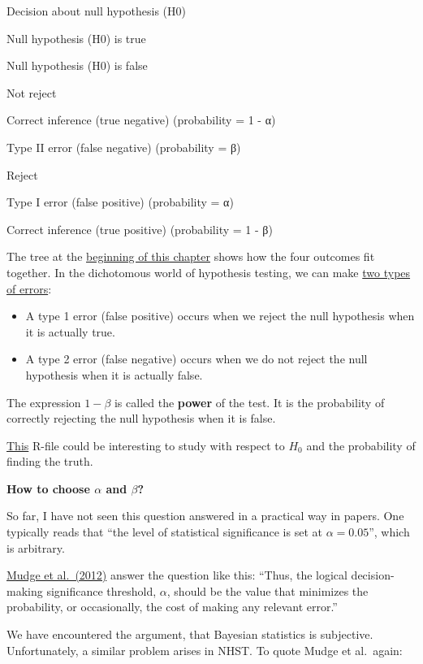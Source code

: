 \documentclass[
]{book}
\providecommand{\tightlist}{%
  \setlength{\itemsep}{0pt}\setlength{\parskip}{0pt}}
\begin{document}
Decision about null hypothesis (H0)

Null hypothesis (H0) is true

Null hypothesis (H0) is false

Not reject

Correct inference (true negative)
(probability = 1 - α)

Type II error (false negative)
(probability = β)

Reject

Type I error (false positive)
(probability = α)

Correct inference (true positive)
(probability = 1 - β)

The tree at the \hyperref[nhst]{beginning of this chapter} shows how the four outcomes fit together.
In the dichotomous world of hypothesis testing, we can make \href{https://en.wikipedia.org/wiki/Type_I_and_type_II_errors}{two types of errors}:

\begin{itemize}
\tightlist
\item
  A type 1 error (false positive) occurs when we reject the null hypothesis when it is actually true.
\item
  A type 2 error (false negative) occurs when we do not reject the null hypothesis when it is actually false.
\end{itemize}

The expression \(1 - \beta\) is called the \textbf{power} of the test.
It is the probability of correctly rejecting the null hypothesis when it is false.

\href{https://github.com/jdegenfellner/ZHAW_Teaching/blob/main/H_0_and_the_truth.R}{This} R-file
could be interesting to study with respect to \(H_0\) and the probability of finding the truth.

\textbf{How to choose \(\alpha\) and \(\beta\)?}

So far, I have not seen this question answered in a practical way in papers.
One typically reads
that ``the level of statistical significance is set at \(\alpha = 0.05\)'', which is arbitrary.

\href{https://journals.plos.org/plosone/article?id=10.1371/journal.pone.0032734}{Mudge et al.~(2012)}
answer the question like this:
``Thus, the logical decision-making significance threshold, \(\alpha\),
should be the value that minimizes the probability, or occasionally,
the cost of making any relevant error.''

We have encountered the argument, that Bayesian statistics is subjective.
Unfortunately, a similar problem arises in NHST. To quote Mudge et al.~again:
\end{document}
